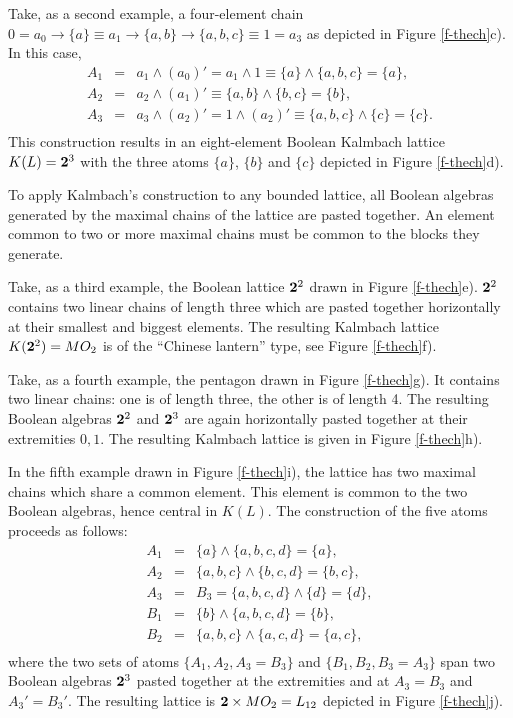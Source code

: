 Take, as a second example, a four-element chain
$0= a_0\rightarrow \{a\}\equiv a_1\rightarrow \{a,b\}
\rightarrow \{a,b,c\}\equiv 1=a_3$
as depicted in Figure
\ref{f-thech}c).
In this case,
\begin{eqnarray*}
A_1&=&a_1\wedge (a_0)'=a_1\wedge 1\equiv \{a\}\wedge \{a,b,c\}=\{a\},\\
A_2&=&a_2\wedge (a_1)'\equiv \{a,b\}\wedge \{b,c\}=\{b\},\\
A_3&=&a_3\wedge (a_2)'=1\wedge (a_2)'\equiv \{a,b,c\}\wedge \{c\}=\{c\}.\\
\end{eqnarray*}
This construction results in an eight-element Boolean Kalmbach lattice
$K(L)={\bf 2}^3$ with the three atoms $\{a\}$, $\{b\}$ and $\{c\}$
depicted in Figure \ref{f-thech}d).



To apply Kalmbach's
construction to any bounded lattice, all Boolean
algebras generated by the maximal chains of the lattice are pasted
together.
An element common to
two or more maximal chains must be common to the blocks they generate.

Take, as a third example, the Boolean lattice ${\bf 2}^2$ drawn in Figure
\ref{f-thech}e).
${\bf 2}^2$ contains two
linear chains of length three which are pasted together horizontally at
their smallest and biggest elements.  The resulting
Kalmbach lattice $K({\bf 2}^2)=MO_2$ is of the ``Chinese lantern'' type,
see Figure \ref{f-thech}f).


Take, as a fourth example, the pentagon drawn in Figure
\ref{f-thech}g).
It contains two
linear chains: one is of length three, the other is of length 4. The
resulting Boolean algebras ${\bf 2}^2$ and ${\bf 2}^3$ are again horizontally
pasted together at their extremities $0,1$.
The resulting
Kalmbach lattice is
given in Figure
\ref{f-thech}h).


In the
fifth example drawn in Figure
\ref{f-thech}i), the lattice has two maximal chains
which
share a common element.  This element is common to the two Boolean
algebras, hence central in $K(L)$.
The construction of the five atoms proceeds as follows:
\begin{eqnarray*}
A_1&=& \{a\}\wedge \{a,b,c,d\}=\{a\},\\
A_2&=& \{a,b,c\}\wedge \{b,c,d\}=\{b,c\},\\
A_3&=&B_3= \{a,b,c,d\}\wedge \{d\}=\{d\},\\
B_1&=& \{b\}\wedge \{a,b,c,d\}=\{b\},\\
B_2&=& \{a,b,c\}\wedge \{a,c,d\}=\{a,c\},\\
\end{eqnarray*}
where the two sets of atoms
$\{A_1,A_2,A_3=B_3\}$ and
$\{B_1,B_2,B_3=A_3\}$ span two Boolean algebras ${\bf 2}^3$ pasted
together at the extremities and at $A_3=B_3$ and $A_3'=B_3'$.
The resulting lattice is ${\bf 2}\times MO_2=L_{12}$ depicted in
Figure \ref{f-thech}j).




